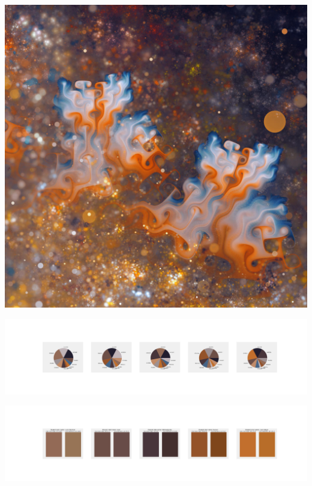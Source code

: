 \documentclass[11pt]{article}
\begin{document}
\begin{landscape}
    \begin{center}
    \includegraphics[width=\textwidth]{./nbimg/file (353).jpg}
    \end{center}

    \begin{center}
    \includegraphics[width=250mm]{./nbimg/pie-282.jpg}
    \end{center}

    \begin{center}
    \includegraphics[width=250mm]{./nbimg/peak-282.jpg}
    \end{center}
    


\end{landscape}
\end{document}
